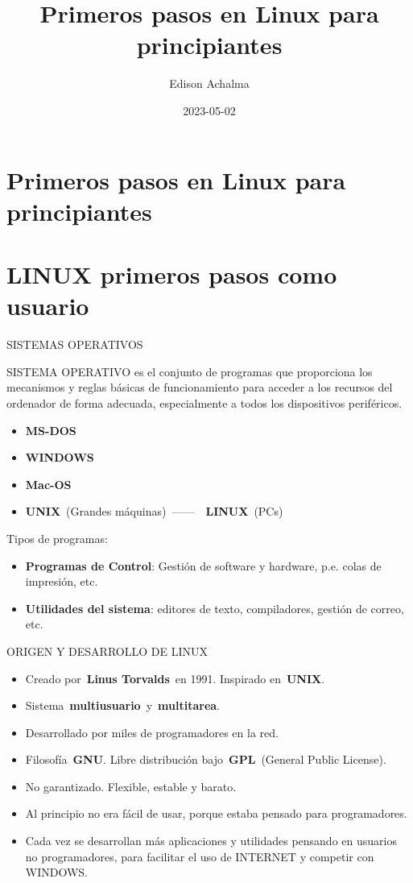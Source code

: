 \documentclass[
  jou,
  floatsintext,
  longtable,
  a4paper,
  nolmodern,
  notxfonts,
  notimes,
  12pt,
  colorlinks=true,linkcolor=blue,citecolor=blue,urlcolor=blue]{apa7}
\title{Primeros pasos en Linux para principiantes}
\author{Edison Achalma}
\affiliation{
{Escuela Profesional de Economía, Universidad Nacional de San Cristóbal
de Huamanga}}
\date{2023-05-02}
\providecommand{\tightlist}{%
  \setlength{\itemsep}{0pt}\setlength{\parskip}{0pt}}
\begin{document}
\maketitle


\hypertarget{toc}{}
\tableofcontents
\newpage
\section[Introduction]{Primeros pasos en Linux para principiantes}

\setcounter{secnumdepth}{3}

\setlength\LTleft{0pt}




\section{LINUX primeros pasos como
usuario}\label{linux-primeros-pasos-como-usuario}

SISTEMAS OPERATIVOS

SISTEMA OPERATIVO es el conjunto de programas que proporciona los
mecanismos y reglas básicas de funcionamiento para acceder a los
recursos del ordenador de forma adecuada, especialmente a todos los
dispositivos periféricos.

\begin{itemize}
\tightlist
\item
  \textbf{MS-DOS}
\item
  \textbf{WINDOWS}
\item
  \textbf{Mac-OS}
\item
  \textbf{UNIX}~(Grandes máquinas)~------~~\textbf{LINUX}~(PCs)
\end{itemize}

Tipos de programas:

\begin{itemize}
\tightlist
\item
  \textbf{Programas de Control}: Gestión de software y hardware, p.e.
  colas de impresión, etc.
\item
  \textbf{Utilidades del sistema}: editores de texto, compiladores,
  gestión de correo, etc.
\end{itemize}

ORIGEN Y DESARROLLO DE LINUX

\begin{itemize}
\tightlist
\item
  Creado por~\textbf{Linus Torvalds}~en 1991. Inspirado
  en~\textbf{UNIX}.
\item
  Sistema~\textbf{multiusuario}~y~\textbf{multitarea}.
\item
  Desarrollado por miles de programadores en la red.
\item
  Filosofía~\textbf{GNU}. Libre distribución bajo~\textbf{GPL}~(General
  Public License).
\item
  No garantizado. Flexible, estable y barato.
\item
  Al principio no era fácil de usar, porque estaba pensado para
  programadores.
\item
  Cada vez se desarrollan más aplicaciones y utilidades pensando en
  usuarios no programadores, para facilitar el uso de INTERNET y
  competir con WINDOWS.
\end{itemize}
\end{document}
